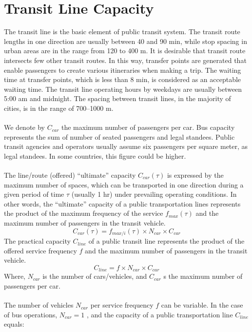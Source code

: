 \section{Transit Line Capacity}
The transit line is the basic element of public transit system. The transit route lengths in one direction are usually between 40 and 90 min, while stop spacing in urban areas are in the range from 120 to 400 m. It is desirable that transit route intersects few other transit routes. In this way, transfer points are generated that enable passengers to create various itineraries when making a trip. The waiting time at transfer points, which is less than 8 min, is considered as an acceptable waiting time. The transit line operating hours by weekdays are usually between 5:00 am and midnight. The spacing between transit lines, in the majority of cities, is in the range of 700–1000 m.\\\\
We denote by $ C_{car} $ the maximum number of passengers per car. Bus capacity represents the sum of number of seated passengers and legal standees. Public transit agencies and operators usually assume six passengers per square meter, as legal standees. In some countries, this figure could be higher.
\\\\
The line/route (offered) “ultimate” capacity $ C_{car}(\tau) $ is expressed by the maximum number of spaces, which can be transported in one direction during a given period of time $\tau$ (usually 1 hr) under prevailing operating conditions. In other words, the “ultimate” capacity of a public transportation lines represents the product of the maximum frequency of the service $ f_{max}(\tau) $ and the maximum number of passengers in the transit vehicle.
$$ C_{car}(\tau) = f_{max/i}(\tau) \times N_{car} \times C_{car} $$
%
The practical capacity $ C_{line} $ of a public transit line represents the product of the offered service frequency $ f $ and the maximum number of passengers in the transit vehicle.
\begin{equation}
	C_{line} = f \times N_{car} \times C_{car}
\end{equation}
Where, $ N_{car} $ is the number of cars/vehicles, and $ C_{car} $ s the maximum number of passengers per car.
\\\\
The number of vehicles $ N_{car} $ per service frequency $ f $ can be variable. In the case of bus operations, $ N_{car} = 1 $ , and the capacity of a public transportation line $ C_{line} $ equals:
